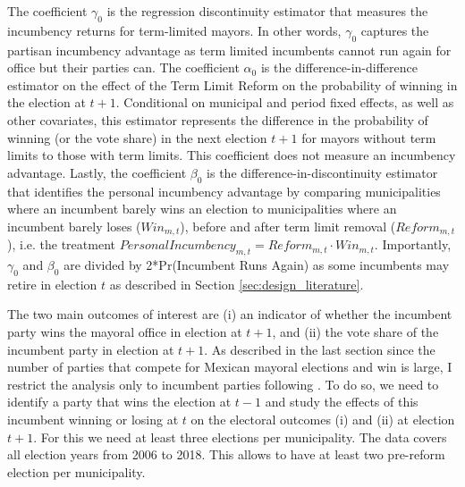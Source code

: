 \documentclass[12pt]{amsart}
\makeatletter
\def\subsection{\@startsection{subsection}{2}
	\z@{.8\linespacing\@plus.7\linespacing}{.7\linespacing}{\large}}
\numberwithin{equation}{section}
\theoremstyle{definition}
\theoremstyle{definition}
\theoremstyle{definition}
\makeatother
\begin{document}
The coefficient $\gamma_0$ is the regression discontinuity estimator that measures the incumbency returns for term-limited mayors. In other words, $\gamma_0$ captures the partisan incumbency advantage as term limited incumbents cannot run again for office but their parties can. The coefficient $\alpha_0$ is the difference-in-difference estimator on the effect of the Term Limit Reform on the probability of winning in the election at $t+1$. Conditional on municipal and period fixed effects, as well as other covariates, this estimator represents the difference in the probability of winning (or the vote share) in the next election $t+1$ for mayors without term limits to those with term limits. This coefficient does not measure an incumbency advantage. Lastly, the coefficient $\beta_0$ is the difference-in-discontinuity estimator that identifies the personal incumbency advantage by comparing municipalities where an incumbent barely wins an election to municipalities where an incumbent barely loses ($Win_{m,t}$), before and after term limit removal ($Reform_{m,t}$), i.e. the treatment $PersonalIncumbency_{m,t}=Reform_{m,t} \cdot Win_{m,t}$. Importantly, $\gamma_0$ and $\beta_0$ are divided by 2*Pr(Incumbent Runs Again) as some incumbents may retire in election $t$ as described in Section \ref{sec:design_literature}. 
 

\subsection{Data}  

The two main outcomes of interest are (i) an indicator of whether the incumbent party wins the mayoral office in election at $t+1$, and (ii) the vote share of the incumbent party in election at $t+1$. As described in the last section since the number of parties that compete for Mexican mayoral elections and win is large, I restrict the analysis only to incumbent parties following \citet{klasnja_titiunik_2017}. To do so, we need to identify a party that wins the election at $t-1$ and study the effects of this incumbent winning or losing at $t$ on the electoral outcomes (i) and (ii) at election $t+1$. For this we need at least three elections per municipality. The data covers all election years from 2006 to 2018. This allows to have at least two pre-reform election per municipality. 
\end{document}
